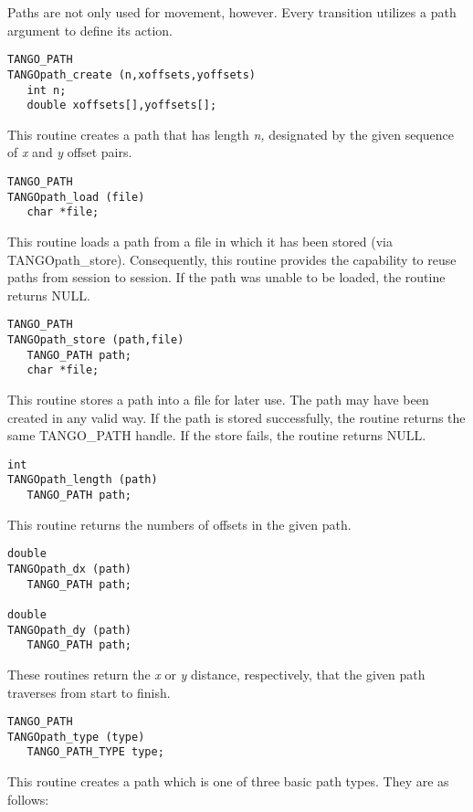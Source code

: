 Paths are not only used for movement, however.  Every transition utilizes a
path argument to define its action.

\vspace{1em}
\begin{verbatim}
TANGO_PATH
TANGOpath_create (n,xoffsets,yoffsets) 
   int n;
   double xoffsets[],yoffsets[];
\end{verbatim}
This routine creates a path that has length {\em n,} designated by the given
sequence of {\em x} and {\em y} offset pairs.

\vspace{1em}
\begin{verbatim}
TANGO_PATH
TANGOpath_load (file) 
   char *file;
\end{verbatim}
This routine loads a path from a file in which it has been stored (via
TANGOpath\_store).  Consequently, this routine provides the capability to
reuse paths from session to session.  If the path was unable to be loaded,
the routine returns NULL.

\vspace{1em}
\begin{verbatim}
TANGO_PATH
TANGOpath_store (path,file) 
   TANGO_PATH path;
   char *file;
\end{verbatim}
This routine stores a path into a file for later use.  The path may have been
created in any valid way.  If the path is stored successfully, the routine
returns the same TANGO\_PATH handle.  If the store fails, the routine
returns NULL.

\vspace{1em}
\begin{verbatim}
int
TANGOpath_length (path) 
   TANGO_PATH path;
\end{verbatim}
This routine returns the numbers of offsets in the given path.

\vspace{1em}
\begin{verbatim}
double
TANGOpath_dx (path) 
   TANGO_PATH path;

double
TANGOpath_dy (path)
   TANGO_PATH path;
\end{verbatim}
These routines return the {\em x} or {\em y} distance, respectively, that the
given path traverses from start to finish.

\vspace{1em}
\begin{verbatim}
TANGO_PATH
TANGOpath_type (type) 
   TANGO_PATH_TYPE type;
\end{verbatim}
This routine creates a path which is one of three basic path types.  They
are as follows:

